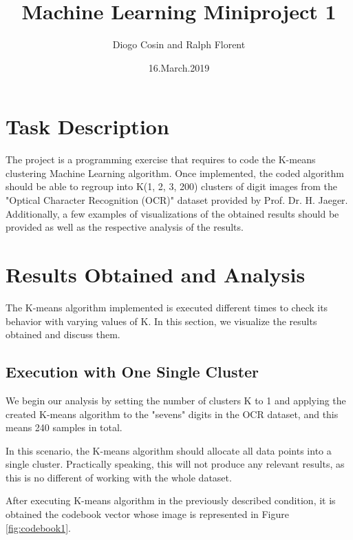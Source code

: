 \documentclass{article}
\title{Machine Learning Miniproject 1}
\author{Diogo Cosin and Ralph Florent}
\date{16.March.2019}
\begin{document}
\maketitle

\section{Task Description}

The project is a programming exercise that requires to code the K-means clustering Machine Learning algorithm. Once implemented, the coded algorithm should be able to regroup into K(1, 2, 3, 200) clusters of digit images from the "Optical Character Recognition (OCR)" dataset provided by Prof. Dr. H. Jaeger. Additionally, a few examples of visualizations of the obtained results should be provided as well as the respective analysis of the results.

\section{Results Obtained and Analysis}

The K-means algorithm implemented is executed different times to check its behavior with varying values of K. In this section, we visualize the results obtained and discuss them.

\subsection{Execution with One Single Cluster}

We begin our analysis by setting the number of clusters K to 1 and applying the created K-means algorithm to the "sevens" digits in the OCR dataset, and this means 240 samples in total.

In this scenario, the K-means algorithm should allocate all data points into a single cluster. Practically speaking, this will not produce any relevant results, as this is no different of working with the whole dataset.

After executing K-means algorithm in the previously described condition, it is obtained the codebook vector whose image is represented in Figure \ref{fig:codebook1}.
\end{document}
